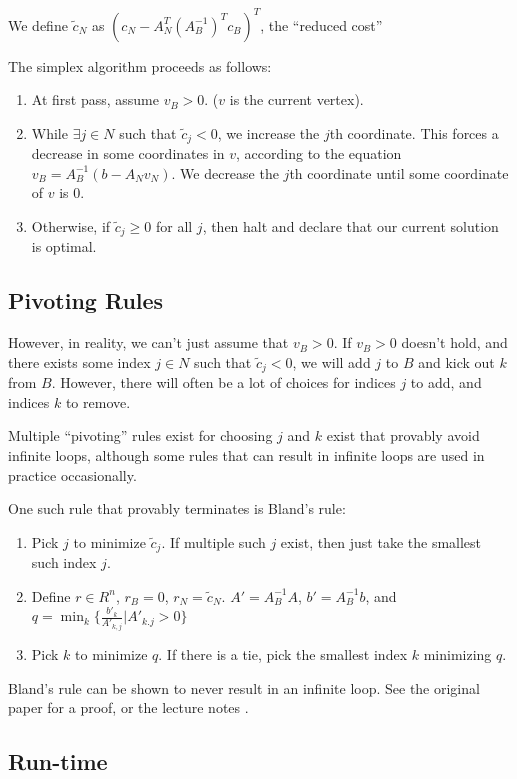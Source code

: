 \documentclass[11pt]{article}
\begin{document}
We define $\tilde{c}_{N}$ as $(c_{N}-A_{N}^{T}(A_{B}^{-1})^{T}c_{B})^{T}$,
the ``reduced cost''

The simplex algorithm proceeds as follows:
\begin{enumerate}
\item At first pass, assume $v_{B}>0$. ($v$ is the current vertex).
\item While $\exists j\in N$ such that $\tilde{c}_{j}<0$, we increase
the $j$th coordinate. This forces a decrease in some coordinates
in $v$, according to the equation $v_{B}=A_{B}^{-1}(b-A_{N}v_{N})$.
We decrease the $j$th coordinate until some coordinate of $v$ is
0. 
\item Otherwise, if $\tilde{c}_{j}\ge0$ for all $j$, then halt and declare
that our current solution is optimal.
\end{enumerate}

\subsection{Pivoting Rules}

However, in reality, we can't just assume that $v_{B}>0$. If $v_{B}>0$
doesn't hold, and there exists some index $j\in N$ such that $\tilde{c}_{j}<0$,
we will add $j$ to $B$ and kick out $k$ from $B$. However, there
will often be a lot of choices for indices $j$ to add, and indices
$k$ to remove. 

Multiple ``pivoting'' rules exist for choosing $j$ and $k$ exist
that provably avoid infinite loops, although some rules that can result
in infinite loops are used in practice occasionally.

One such rule that provably terminates is Bland's rule: 
\begin{enumerate}
\item Pick $j$ to minimize $\tilde{c}_{j}$. If multiple such $j$ exist,
then just take the smallest such index $j$. 
\item Define $r\in R^{n}$, $r_{B}=0$, $r_{N}=\tilde{c}_{N}$. $A'=A_{B}^{-1}A$,
$b'=A_{B}^{-1}b$, and $q=\min_{k}\{\frac{b'_{k}}{A'_{k,j}}|A'_{k.j}>0\}$
\item Pick $k$ to minimize $q$. If there is a tie, pick the smallest index
$k$ minimizing $q$.
\end{enumerate}
Bland's rule can be shown to never result in an infinite loop. See
the original paper \cite{BlandMOR77} for a proof, or the lecture notes \cite{Ye}.


\subsection{Run-time}
\end{document}
